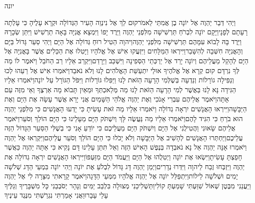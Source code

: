 \documentclass[../main/main.tex]{subfiles}
\begin{document}
\Incipit{}יונה\par
\vspace{\afterchapskip}
\RTLmulticolcolumns
\begin{multicols}{\ncols}
וַיְהִי דְּבַר יַהְוֶה אֶל יוֹנָה בֶן אֲמִתַּי לֵאמֹר\PreVerseSpace{}קוּם לֵךְ אֶל נִינְוֵה הָעִיר הַגְּדוֹלָה וּקְרָא עָלֶיהָ כִּי עָלְתָה רָעָתָם לְפָנָי\PreVerseSpace{}וַיָּקָם יוֹנָה לִבְרֹחַ תַּרְשִׁישָׁה מִלִּפְנֵי יַהְוֶה וַיֵּרֶד יָפוֹ וַיִּמְצָא אֳנִיָּה בָּאָה תַרְשִׁישׁ וַיִּתֵּן שְׂכָרָהּ וַיֵּרֶד בָּהּ לָבוֹא עִמָּהֶם תַּרְשִׁישָׁה מִלִּפְנֵי יַהְוֶה\PreVerseSpace{}וַיהוָה הֵטִיל רוּחַ גְּדוֹלָה אֶל הַיָּם וַיְהִי סַעַר גָּדוֹל בַּיָּם וְהָאֳנִיָּה חִשְּׁבָה לְהִשָּׁבֵר\PreVerseSpace{}וַיִּירְאוּ הַמַּלָּחִים וַיִּזְעֲקוּ אִישׁ אֶל אֱלֹהָיו וַיָּטִלוּ אֶת הַכֵּלִים אֲשֶׁר בָּאֳנִיָּה אֶל הַיָּם לְהָקֵל מֵעֲלֵיהֶם וְיוֹנָה יָרַד אֶל יַרְכְּתֵי הַסְּפִינָה וַיִּשְׁכַּב וַיֵּרָדַם\PreVerseSpace{}וַיִּקְרַב אֵלָיו רַב הַחֹבֵל וַיֹּאמֶר לוֹ מַה לְּךָ נִרְדָּם קוּם קְרָא אֶל אֱלֹהֶיךָ אוּלַי יִתְעַשֵּׁת הָאֱלֹהִים לָנוּ וְלֹא נֹאבֵד\PreVerseSpace{}וַיֹּאמְרוּ אִישׁ אֶל רֵעֵהוּ לְכוּ וְנַפִּילָה גוֹרָלוֹת וְנֵדְעָה בְּשֶׁלְּמִי הָרָעָה הַזֹּאת לָנוּ וַיַּפִּלוּ גּוֹרָלוֹת וַיִּפֹּל הַגּוֹרָל עַל יוֹנָה\PreVerseSpace{}וַיֹּאמְרוּ אֵלָיו הַגִּידָה נָּא לָנוּ בַּאֲשֶׁר לְמִי הָרָעָה הַזֹּאת לָנוּ מַה מְּלַאכְתְּךָ וּמֵאַיִן תָּבוֹא מָה אַרְצֶךָ וְאֵי מִזֶּה עַם אָתָּה\PreVerseSpace{}וַיֹּאמֶר אֲלֵיהֶם עִבְרִי אָנֹכִי וְאֶת יַהְוֶה אֱלֹהֵי הַשָּׁמַיִם אֲנִי יָרֵא אֲשֶׁר עָשָׂה אֶת הַיָּם וְאֶת הַיַּבָּשָׁה\PreVerseSpace{}וַיִּירְאוּ הָאֲנָשִׁים יִרְאָה גְדוֹלָה וַיֹּאמְרוּ אֵלָיו מַה זֹּאת עָשִׂיתָ כִּי יָדְעוּ הָאֲנָשִׁים כִּי מִלִּפְנֵי יַהְוֶה הוּא בֹרֵחַ כִּי הִגִּיד לָהֶם\PreVerseSpace{}וַיֹּאמְרוּ אֵלָיו מַה נַּעֲשֶׂה לָּךְ וְיִשְׁתֹּק הַיָּם מֵעָלֵינוּ כִּי הַיָּם הוֹלֵךְ וְסֹעֵר\PreVerseSpace{}וַיֹּאמֶר אֲלֵיהֶם שָׂאוּנִי וַהֲטִילֻנִי אֶל הַיָּם וְיִשְׁתֹּק הַיָּם מֵעֲלֵיכֶם כִּי יוֹדֵעַ אָנִי כִּי בְשֶׁלִּי הַסַּעַר הַגָּדוֹל הַזֶּה עֲלֵיכֶם\PreVerseSpace{}וַיַּחְתְּרוּ הָאֲנָשִׁים לְהָשִׁיב אֶל הַיַּבָּשָׁה וְלֹא יָכֹלוּ כִּי הַיָּם הוֹלֵךְ וְסֹעֵר עֲלֵיהֶם\PreVerseSpace{}וַיִּקְרְאוּ אֶל יַהְוֶה וַיֹּאמְרוּ אָנָּה יַהְוֶה אַל נָא נֹאבְדָה בְּנֶפֶשׁ הָאִישׁ הַזֶּה וְאַל תִּתֵּן עָלֵינוּ דָּם נָקִיא כִּי אַתָּה יַהְוֶה כַּאֲשֶׁר חָפַצְתָּ עָשִׂיתָ\PreVerseSpace{}וַיִּשְׂאוּ אֶת יוֹנָה וַיְטִלֻהוּ אֶל הַיָּם וַיַּעֲמֹד הַיָּם מִזַּעְפּוֹ\PreVerseSpace{}וַיִּירְאוּ הָאֲנָשִׁים יִרְאָה גְדוֹלָה אֶת יַהְוֶה וַיִּזְבְּחוּ זֶבַח לַיהוָה וַיִּדְּרוּ נְדָרִים\PreChapterSpace{}וַיְמַן יַהְוֶה דָּג גָּדוֹל לִבְלֹעַ אֶת יוֹנָה וַיְהִי יוֹנָה בִּמְעֵי הַדָּג שְׁלֹשָׁה יָמִים וּשְׁלֹשָׁה לֵילוֹת\PreVerseSpace{}וַיִּתְפַּלֵּל יוֹנָה אֶל יַהְוֶה אֱלֹהָיו מִמְּעֵי הַדָּגָה\PreVerseSpace{}וַיֹּאמֶר קָרָאתִי מִצָּרָה לִי אֶל יַהְוֶה וַיַּעֲנֵנִי מִבֶּטֶן שְׁאוֹל שִׁוַּעְתִּי שָׁמַעְתָּ קוֹלִי\PreVerseSpace{}וַתַּשְׁלִיכֵנִי מְצוּלָה בִּלְבַב יַמִּים וְנָהָר יְסֹבְבֵנִי כָּל מִשְׁבָּרֶיךָ וְגַלֶּיךָ עָלַי עָבָרוּ\PreVerseSpace{}וַאֲנִי אָמַרְתִּי נִגְרַשְׁתִּי מִנֶּגֶד עֵינֶיךָ 
\end{multicols}
\end{document}
